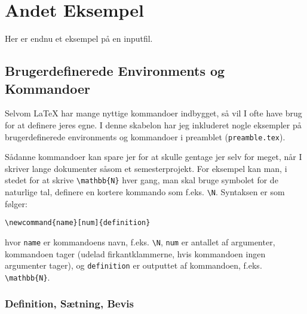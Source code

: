 
\chapter{Andet Eksempel}
\label{ch:second-example}

Her er endnu et eksempel på en inputfil.


\section{Brugerdefinerede Environments og Kommandoer}
\label{sec:custom}

Selvom \LaTeX{} har mange nyttige kommandoer indbygget, så vil I ofte have brug for at definere jeres egne.
I denne skabelon har jeg inkluderet nogle eksempler på brugerdefinerede environments og kommandoer i preamblet (\texttt{preamble.tex}).

Sådanne kommandoer kan spare jer for at skulle gentage jer selv for meget, når I skriver lange dokumenter såsom et semesterprojekt.
For eksempel kan man, i stedet for at skrive \verb!\mathbb{N}! hver gang, man skal bruge symbolet for de naturlige tal, definere en kortere kommando som f.eks. \verb!\N!.
Syntaksen er som følger:
%
\begin{verbatim}
\newcommand{name}[num]{definition}
\end{verbatim}
%
hvor \texttt{name} er kommandoens navn, f.eks. \verb!\N!, \texttt{num} er antallet af argumenter, kommandoen tager (udelad firkantklammerne, hvis kommandoen ingen argumenter tager), og \texttt{definition} er outputtet af kommandoen, f.eks. \verb!\mathbb{N}!.


\subsection{Definition, Sætning, Bevis}
\label{sec:thms}

